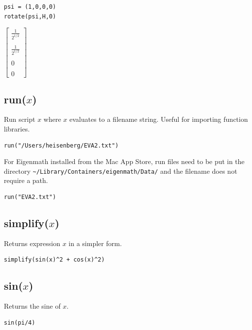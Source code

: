 \documentclass[12pt]{article}
\begin{document}
{\color{blue}
\begin{verbatim}
psi = (1,0,0,0)
rotate(psi,H,0)
\end{verbatim}
}

\noindent
$\displaystyle
\begin{bmatrix}
{\displaystyle \frac{1}{2^{1/2}}}
\\
\\
{\displaystyle \frac{1}{2^{1/2}}}
\\
\\
0
\\
\\
0
\end{bmatrix}
$

\subsection*{run($x$)}

Run script $x$ where $x$ evaluates to a filename string.
Useful for importing function libraries.

{\color{blue}
\begin{verbatim}
run("/Users/heisenberg/EVA2.txt")
\end{verbatim}
}

For Eigenmath installed from the Mac App Store,
run files need to be put in the directory
\verb$~/Library/Containers/eigenmath/Data/$
and the filename does not require a path.

{\color{blue}
\begin{verbatim}
run("EVA2.txt")
\end{verbatim}
}

\subsection*{simplify($x$)}

Returns expression $x$ in a simpler form.

{\color{blue}
\begin{verbatim}
simplify(sin(x)^2 + cos(x)^2)
\end{verbatim}
}


\subsection*{sin($x$)}

Returns the sine of $x$.

{\color{blue}
\begin{verbatim}
sin(pi/4)
\end{verbatim}
}
\end{document}
